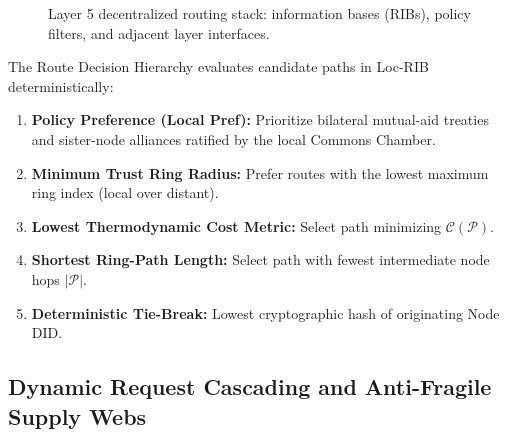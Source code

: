 \begin{figure}[htbp]
\caption{Layer 5 decentralized routing stack: information bases (RIBs), policy filters, and adjacent layer interfaces.}
\label{fig:l5-routing-architecture}
\end{figure}

The Route Decision Hierarchy evaluates candidate paths in Loc-RIB deterministically:
\begin{enumerate}
  \item \textbf{Policy Preference (Local Pref):} Prioritize bilateral mutual-aid treaties and sister-node alliances ratified by the local Commons Chamber.
  \item \textbf{Minimum Trust Ring Radius:} Prefer routes with the lowest maximum ring index (local over distant).
  \item \textbf{Lowest Thermodynamic Cost Metric:} Select path minimizing $\mathcal{C}(\mathcal{P})$.
  \item \textbf{Shortest Ring-Path Length:} Select path with fewest intermediate node hops $|\mathcal{P}|$.
  \item \textbf{Deterministic Tie-Break:} Lowest cryptographic hash of originating Node DID.
\end{enumerate}

\subsection{Dynamic Request Cascading and Anti-Fragile Supply Webs}

